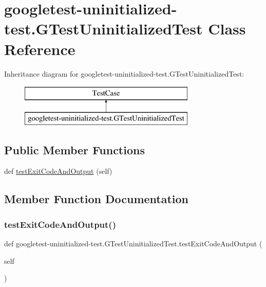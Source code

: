 \hypertarget{classgoogletest-uninitialized-test_1_1_g_test_uninitialized_test}{}\section{googletest-\/uninitialized-\/test.G\+Test\+Uninitialized\+Test Class Reference}
\label{classgoogletest-uninitialized-test_1_1_g_test_uninitialized_test}
Inheritance diagram for googletest-\/uninitialized-\/test.G\+Test\+Uninitialized\+Test\+:\begin{figure}[H]
\begin{center}
\leavevmode
\includegraphics[height=2.000000cm]{d5/d7c/classgoogletest-uninitialized-test_1_1_g_test_uninitialized_test}
\end{center}
\end{figure}
\subsection*{Public Member Functions}
\begin{DoxyCompactItemize}
\item 
def \mbox{\hyperlink{classgoogletest-uninitialized-test_1_1_g_test_uninitialized_test_aa3c5445f3d94a94d9b252fd64f05e4a0}{test\+Exit\+Code\+And\+Output}} (self)
\end{DoxyCompactItemize}


\subsection{Member Function Documentation}
\mbox{\label{classgoogletest-uninitialized-test_1_1_g_test_uninitialized_test_aa3c5445f3d94a94d9b252fd64f05e4a0}} 
\subsubsection{\texorpdfstring{testExitCodeAndOutput()}{testExitCodeAndOutput()}}
{\footnotesize\ttfamily def googletest-\/uninitialized-\/test.\+G\+Test\+Uninitialized\+Test.\+test\+Exit\+Code\+And\+Output (\begin{DoxyParamCaption}\item[{}]{self }\end{DoxyParamCaption})}



